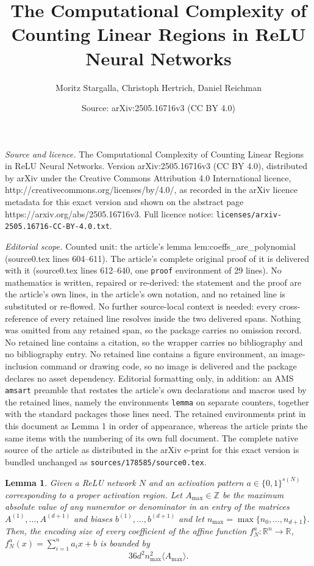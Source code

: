 \documentclass[10pt,a4paper]{amsart}
\title{The Computational Complexity of Counting Linear Regions in ReLU Neural Networks}
\author{Moritz Stargalla, Christoph Hertrich, Daniel Reichman}
\date{Source: arXiv:2505.16716v3 (CC BY 4.0)}
\newtheorem{lemma}{Lemma}
\begin{document}
\maketitle

\noindent\emph{Source and licence.} The Computational Complexity of Counting Linear Regions in ReLU Neural Networks. Version arXiv:2505.16716v3 (CC BY 4.0), distributed by arXiv under the Creative Commons Attribution 4.0 International licence, http://creativecommons.org/licenses/by/4.0/, as recorded in the arXiv licence metadata for this exact version and shown on the abstract page https://arxiv.org/abs/2505.16716v3. Full licence notice: \texttt{licenses/arxiv-2505.16716-CC-BY-4.0.txt}.\par\smallskip

\noindent\textit{Editorial scope.} Counted unit: the article's lemma lem:coeffs\_are\_polynomial (source0.tex lines 604--611). The article's complete original proof of it is delivered with it (source0.tex lines 612--640, one \texttt{proof} environment of 29 lines). No mathematics is written, repaired or re-derived: the statement and the proof are the article's own lines, in the article's own notation, and no retained line is substituted or re-flowed.  No further source-local context is needed: every cross-reference of every retained line resolves inside the two delivered spans.  Nothing was omitted from any retained span, so the package carries no omission record.  No retained line contains a citation, so the wrapper carries no bibliography and no bibliography entry.  No retained line contains a figure environment, an image-inclusion command or drawing code, so no image is delivered and the package declares no asset dependency.  Editorial formatting only, in addition: an AMS \texttt{amsart} preamble that restates the article's own declarations and macros used by the retained lines, namely the environments \texttt{lemma} on separate counters, together with the standard packages those lines need.  The retained environments print in this document as Lemma 1 in order of appearance, whereas the article prints the same items with the numbering of its own full document.  The complete native source of the article as distributed in the arXiv e-print for this exact version is bundled unchanged as \texttt{sources/178585/source0.tex}.
\begin{lemma}
\label{lem:coeffs_are_polynomial}
    Given a ReLU network $N$ and an activation pattern $a\in \{0,1\}^{s(N)}$ corresponding to a proper activation region. Let $A_{\max}\in \mathbb{Z}$ be the maximum absolute value of any numerator or denominator in an entry of the matrices $A^{(1)},\dots, A^{(d+1)}$ and biases $b^{(1)},\dots, b^{(d+1)}$ and let $n_{\max}=\max\{n_0,\dots,n_{d+1}\}$.
    Then, the encoding size of every coefficient of the affine function $f_N^a:\mathbb{R}^n\to \mathbb{R}$, $f_N^a(x)=\sum_{i=1}^n a_ix + b$ is bounded by
    \[
    36d^2n_{\max}^2\langle A_{\max}\rangle.
    \]
\end{lemma}
\end{document}
